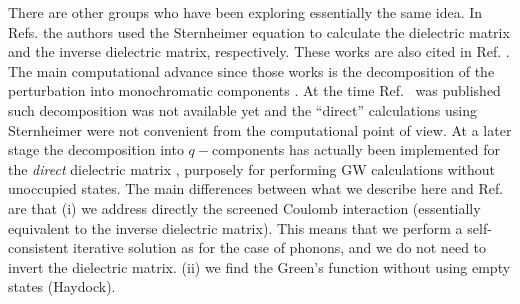 \documentclass[12pt]{article}
\begin{document}
There are other groups who have been exploring essentially the same idea.
In Refs. \cite{kunc1,kunc2} the authors used
the Sternheimer equation to calculate the dielectric matrix and the
inverse dielectric matrix, respectively. These works are also cited
in Ref. \cite{hl86}. The main computational advance since those works
is the decomposition of the perturbation into monochromatic components
\cite{baroni}. At the time Ref.\ \cite{hl86} was published
such decomposition was not available
yet and the ``direct'' calculations using Sternheimer were not convenient
from the computational point of view.
At a later stage the decomposition into $q-$components has actually been
implemented for the {\it direct} dielectric matrix \cite{reining}, purposely
for performing GW calculations without unoccupied states.
The main differences between what we describe here and Ref.\ \cite{reining}
are that (i) we address directly the screened Coulomb interaction (essentially
equivalent to the inverse dielectric matrix). This means that we perform
a self-consistent iterative solution as for the case of phonons, and we do not
need to invert the dielectric matrix. (ii) we find the Green's function
without using empty states (Haydock).
\end{document}

